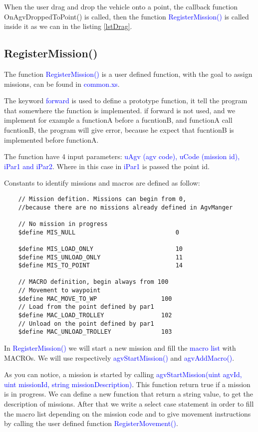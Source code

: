 When the user drag and drop the vehicle onto a point, the callback function {OnAgvDroppedToPoint()} is called, then the function \textcolor{blue}{RegisterMission()} is called inside it as we can in the listing \ref{lstDrag}.

%
\subsection*{RegisterMission()}
The function \textcolor{blue}{RegisterMission()} is a user defined function, with the goal to assign missions, can be found in \textcolor{blue}{common.xs}.

The keyword \textcolor{blue}{forward} is used to define a prototype function, it tell the program that somewhere the function is implemented. if {forward} is not used, and we implement for example a functionA before a fucntionB, and functionA call fucntionB, the program will give error, because he expect that fucntionB is implemented before functionA.

The function have 4 input parameters: \textcolor{blue}{uAgv (agv code), uCode (mission id), iPar1 and iPar2}. Where in this case in \textcolor{blue}{iPar1} is passed the point id.

Constants to identify missions and macros are defined as follow:\\

\begin{lstlisting}
	// Mission defition. Missions can begin from 0, 
	//because there are no missions already defined in AgvManger
	
	// No mission in progress
	$define MIS_NULL							0
	
	$define MIS_LOAD_ONLY						10
	$define MIS_UNLOAD_ONLY						11
	$define MIS_TO_POINT						14
	
	// MACRO definition, begin always from 100
	// Movement to waypoint
	$define MAC_MOVE_TO_WP					100
	// Load from the point defined by par1
	$define MAC_LOAD_TROLLEY				102
	// Unload on the point defined by par1
	$define MAC_UNLOAD_TROLLEY				103
\end{lstlisting}

In \textcolor{blue}{RegisterMission()} we will start a new mission and fill the \textcolor{blue}{macro list} with MACROs. We will use respectively \textcolor{blue}{agvStartMission()} and \textcolor{blue}{agvAddMacro()}.

As you can notice, a mission is started by calling \textcolor{blue}{agvStartMission(uint agvId, uint missionId, string missionDescription)}. This function return true if a mission is in progress. We can define a new function that return a string value, to get the description of missions.
After that we write a select case statement in order to fill the macro list depending on the mission code and to give movement instructions by calling the user defined function \textcolor{blue}{RegisterMovement()}.

